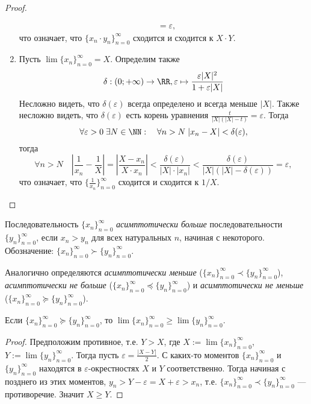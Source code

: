 \documentclass[12pt,a4paper]{article}
\begin{document}
\begin{proof}
\begin{enumerate}
\begin{align*}
                    &= \varepsilon,
                \end{align*}
                что означает, что $\{x_n \cdot y_n\}_{n=0}^\infty$ сходится и сходится к $X \cdot Y$.
            \item Пусть $\lim \{x_n\}_{n=0}^\infty = X$. Определим также
                \[\delta: (0; +\infty) \to \RR, \varepsilon \mapsto \frac{\varepsilon |X|^2}{1 + \varepsilon |X|}\]
                Несложно видеть, что $\delta(\varepsilon)$ всегда определено и всегда меньше $|X|$. Также несложно видеть, что $\delta(\varepsilon)$ есть корень уравнения $\frac{t}{|X|(|X| - t)} = \varepsilon$. Тогда
                \[\forall \varepsilon > 0\; \exists N \in \NN:\quad \forall n > N\; |x_n - X| < \delta(\varepsilon),\]
                тогда
                \[\forall n > N\quad \left|\frac{1}{x_n} - \frac{1}{X}\right| = \left|\frac{X-x_n}{X\cdot x_n}\right| < \frac{\delta(\varepsilon)}{|X| \cdot |x_n|} < \frac{\delta(\varepsilon)}{|X|(|X|-\delta(\varepsilon))} = \varepsilon,\]
                что означает, что $\{\frac{1}{x_n}\}_{n=0}^\infty$ сходится и сходится к $1/X$.
        \end{enumerate}
    \end{proof}

    \begin{definition}
        Последовательность $\{x_n\}_{n=0}^\infty$ \emph{асимптотически больше} последовательности $\{y_n\}_{n=0}^\infty$, если $x_n > y_n$ для всех натуральных $n$, начиная с некоторого. Обозначение: $\{x_n\}_{n=0}^\infty \succ \{y_n\}_{n=0}^\infty$.

        Аналогично определяются \emph{асимптотически меньше} ($\{x_n\}_{n=0}^\infty \prec \{y_n\}_{n=0}^\infty$), \emph{асимптотически не больше} ($\{x_n\}_{n=0}^\infty \preccurlyeq \{y_n\}_{n=0}^\infty$) и \emph{асимптотически не меньше} ($\{x_n\}_{n=0}^\infty \succcurlyeq \{y_n\}_{n=0}^\infty$).
    \end{definition}

    \begin{statement}\label{stupid_seq_statement_1}
        Если $\{x_n\}_{n=0}^\infty \succcurlyeq \{y_n\}_{n=0}^\infty$, то $\lim \{x_n\}_{n=0}^\infty \geqslant \lim \{y_n\}_{n=0}^\infty$.
    \end{statement}

    \begin{proof}
        Предположим противное, т.е. $Y > X$, где $X := \lim \{x_n\}_{n=0}^\infty$, $Y := \lim \{y_n\}_{n=0}^\infty$. Тогда пусть $\varepsilon = \frac{|X - Y|}{2}$. С каких-то моментов $\{x_n\}_{n=0}^\infty$ и $\{y_n\}_{n=0}^\infty$ находятся в $\varepsilon$-окрестностях $X$ и $Y$ соответственно. Тогда начиная с позднего из этих моментов, $y_n > Y - \varepsilon = X + \varepsilon > x_n$, т.е. $\{x_n\}_{n=0}^\infty \prec \{y_n\}_{n=0}^\infty$ --- противоречие. Значит $X \geqslant Y$.
    \end{proof}
\end{document}
